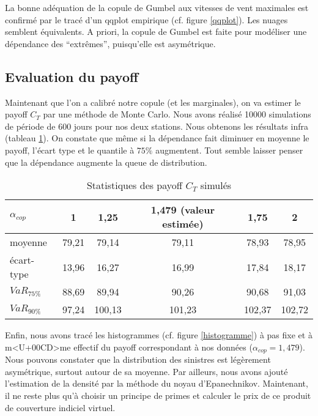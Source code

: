 \documentclass[11pt,a4paper]{article}
\begin{document}
La bonne ad\'equation de la copule de Gumbel aux vitesses de vent maximales est confirm\'e
par le trac\'e d'un qqplot empirique (cf. figure \ref{qqplot}). Les nuages semblent \'equivalents.
A priori, la copule de Gumbel est faite pour mod\'eliser une d\'ependance des ``extr\^emes'', puisqu'elle
est asym\'etrique.

\subsection{Evaluation du payoff}
Maintenant que l'on a calibr\'e notre copule (et les marginales), on va estimer le payoff $C_T$ par une m\'ethode
de Monte Carlo. Nous avons r\'ealis\'e 10000 simulations de p\'eriode de 600 jours pour nos deux stations. Nous obtenons
les r\'esultats infra (tableau \ref{payoff}). On constate que m\^eme si la d\'ependance fait diminuer en moyenne le payoff,
l'\'ecart type et le quantile \`a $75\%$ augmentent. Tout semble laisser penser que la d\'ependance augmente
la queue de distribution.
\begin{table}[!htb]
\center
\begin{tabular}{lccccc}
\hline
$\alpha_{cop}$ & 1 & 1,25 & 1,479 (valeur estim\'ee) & 1,75 & 2\\
\hline
moyenne & 79,21 & 79,14 & 79,11 & 78,93 & 78,95 \\
\hline
\'ecart-type & 13,96 & 16,27 & 16,99 & 17,84 & 18,17\\
\hline
$VaR_{75\%}$ & 88,69 & 89,94 & 90,26 & 90,68 & 91,03\\
\hline
$VaR_{90\%}$ & 97,24 & 100,13 & 101,23 & 102,37 & 102,72\\
\hline
\end{tabular}
\caption{Statistiques des payoff $C_T$ simul\'es}
\label{payoff}
\end{table}


Enfin, nous avons trac\'e les histogrammes (cf. figure \ref{histogramme}) \`a pas fixe et \`a m<U+00CD>me effectif du payoff correspondant
\`a nos donn\'ees ($\alpha_{cop}= 1,479 $). Nous pouvons constater que la distribution
des sinistres est l\'eg\`erement asym\'etrique, surtout autour de sa moyenne. Par ailleurs, nous avons ajout\'e
l'estimation de la densit\'e par la m\'ethode du noyau d'Epanechnikov. Maintenant, il ne reste plus qu'\`a choisir
un principe de primes et calculer le prix de ce produit de couverture indiciel virtuel.
\end{document}
